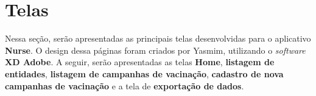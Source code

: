 

\section{Telas}
\label{cap4:Sec:Telas}

Nessa seção, serão apresentadas as principais telas desenvolvidas para o aplicativo \textbf{Nurse}. O design dessa páginas foram criados por Yasmim, utilizando o \textit{software} \textbf{XD Adobe}. A seguir, serão apresentadas as telas \textbf{Home}, \textbf{listagem de entidades}, \textbf{listagem de campanhas de vacinação}, \textbf{cadastro de nova campanhas de vacinação} e a tela de \textbf{exportação de dados}.


